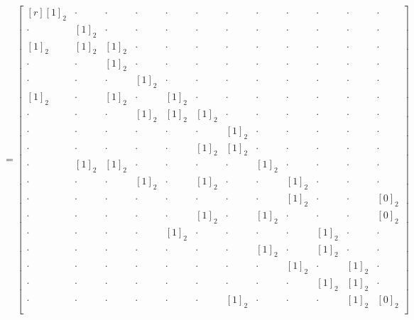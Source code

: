 \documentclass[a4paper]{report}
\begin{document}
\[
    =\begin{bmatrix*}[r]
        [1]_2   & \cdot & \cdot & \cdot & \cdot & \cdot & \cdot & \cdot & \cdot & \cdot & \cdot & \cdot \\
        \cdot   & [1]_2 & \cdot & \cdot & \cdot & \cdot & \cdot & \cdot & \cdot & \cdot & \cdot & \cdot \\
        [1]_2  & [1]_2& [1]_2 & \cdot & \cdot & \cdot & \cdot & \cdot & \cdot & \cdot & \cdot & \cdot \\
        \cdot   & \cdot & [1]_2& \cdot & \cdot & \cdot & \cdot & \cdot & \cdot & \cdot & \cdot & \cdot \\
        \cdot   & \cdot & \cdot & [1]_2 & \cdot & \cdot & \cdot & \cdot & \cdot & \cdot & \cdot & \cdot \\
        [1]_2   & \cdot & [1]_2& \cdot & [1]_2 & \cdot & \cdot & \cdot & \cdot & \cdot & \cdot & \cdot \\
        \cdot   & \cdot & \cdot & [1]_2& [1]_2& [1]_2 & \cdot & \cdot & \cdot & \cdot & \cdot & \cdot \\
        \cdot   & \cdot & \cdot & \cdot & \cdot & \cdot & [1]_2     & \cdot & \cdot & \cdot & \cdot & \cdot \\
        \cdot   & \cdot & \cdot & \cdot & \cdot & [1]_2    & [1]_2    & \cdot & \cdot & \cdot & \cdot & \cdot \\
        \cdot   & [1]_2 & [1]_2 & \cdot & \cdot & \cdot & \cdot & [1]_2     & \cdot & \cdot & \cdot & \cdot \\
        \cdot   & \cdot & \cdot & [1]_2 & \cdot & [1]_2    & \cdot & \cdot & [1]_2     & \cdot & \cdot & \cdot \\
        \cdot   & \cdot & \cdot & \cdot & \cdot & \cdot & \cdot & \cdot & [1]_2    & \cdot & \cdot & [0]_2     \\
        \cdot   & \cdot & \cdot & \cdot & \cdot & [1]_2     & \cdot & [1]_2    & \cdot & \cdot & \cdot & [0]_2    \\
        \cdot   & \cdot & \cdot & \cdot & [1]_2     & \cdot & \cdot & \cdot & \cdot & [1]_2     & \cdot & \cdot \\
        \cdot   & \cdot & \cdot & \cdot & \cdot & \cdot & \cdot & [1]_2     & \cdot & [1]_2    & \cdot & \cdot \\
        \cdot   & \cdot & \cdot & \cdot & \cdot & \cdot & \cdot & \cdot & [1]_2     & \cdot & [1]_2     & \cdot \\
        \cdot   & \cdot & \cdot & \cdot & \cdot & \cdot & \cdot & \cdot & \cdot & [1]_2     & [1]_2    & \cdot \\
        \cdot   & \cdot & \cdot & \cdot & \cdot & \cdot & [1]_2     & \cdot & \cdot & \cdot & [1]_2     & [0]_2     \\
    \end{bmatrix*}
\]\\
\end{document}
